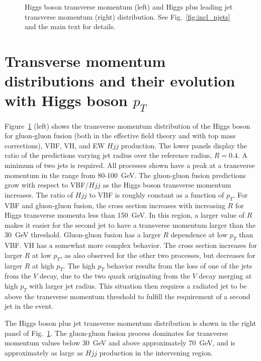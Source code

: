 \documentclass[10pt,prd,fleqn,superscriptaddress,notitlepage,nofootinbib,preprintnumbers,nobalancelastpage]{revtex4-1}
\newcommand{\VBF}{VBF\xspace}
\newcommand{\VH}{VH\xspace}
\begin{document}
\begin{figure}[p]
\begin{minipage}{.295\textwidth}
  \end{minipage}
\caption{Higgs boson transverse momentum (left) and Higgs plus leading jet transverse momentum (right) distribution.
See Fig.~\ref{fig:incl_njets} and the main text for details.}
\label{fig:incl_pth}
\end{figure}

\section{Transverse momentum distributions and their evolution with Higgs boson $p_T$}
\label{sec:transverse}

Figure~\ref{fig:incl_pth} (left) shows the transverse momentum distribution of the Higgs boson for gluon-gluon fusion (both in the effective field theory and with top mass corrections), \VBF, \VH, and EW $Hjj$ production. The lower panels display the ratio of the predictions varying jet radius over the reference radius, $R=0.4$. A minimum of two jets is required. All processes shown have a peak at a transverse momentum in the range from 80-100~GeV. The gluon-gluon fusion predictions  grow with respect to \VBF/$Hjj$ as the Higgs boson transverse momentum increases. The ratio of $Hjj$ to \VBF is roughly constant as a function of $p_T$. For \VBF and gluon-gluon fusion, the cross section increases with increasing $R$ for Higgs transverse momenta less than 150~GeV. In this region, a larger value of $R$ makes it easier for the second jet to have a transverse momentum larger than the 30~GeV threshold. Gluon-gluon fusion has a larger $R$ dependence at low $p_T$ than \VBF.
\VH has a somewhat more complex behavior. The cross section increases for larger $R$ at low $p_T$, as also observed for the other two processes, but decreases for larger $R$ at high $p_T$. The high $p_T$ behavior  results from the loss of one of the jets from the $V$ decay,
due to the two quark originating from the $V$ decay merging at high $p_T$ with larger jet radius. This situation then requires a radiated jet to be above the transverse momentum threshold to fulfill the requirement of a second jet in the event.



The Higgs boson plus jet transverse momentum distribution is shown in the right panel of Fig.~\ref{fig:incl_pth}.
The gluon-gluon fusion process dominates for transverse momentum values below 30~GeV and above approximately 70~GeV,
and is approximately as large as $Hjj$ production in the intervening region.
\end{document}
